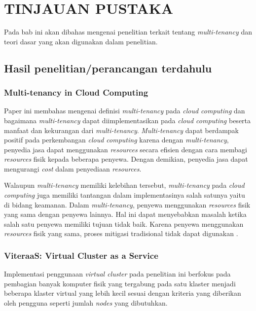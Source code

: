 \chapter{TINJAUAN PUSTAKA}

Pada bab ini akan dibahas mengenai penelitian terkait tentang \emph{multi-tenancy}
dan teori dasar yang akan digunakan dalam penelitian.

\section{Hasil penelitian/perancangan terdahulu}

\subsection{Multi-tenancy in Cloud Computing}

Paper ini membahas mengenai definisi \emph{multi-tenancy} pada \emph{cloud computing}
dan bagaimana \emph{multi-tenancy} dapat diimplementasikan pada \emph{cloud computing} beserta
manfaat dan kekurangan dari \emph{multi-tenancy}. \emph{Multi-tenancy} dapat berdampak positif
pada perkembangan \emph{cloud computing} karena dengan \emph{multi-tenancy}, penyedia jasa dapat
menggunakan \emph{resources} secara efisien dengan cara membagi \emph{resources} fisik kepada
beberapa penyewa. Dengan demikian, penyedia jasa dapat mengurangi \emph{cost} dalam penyediaan \emph{resources}.

Walaupun \emph{multi-tenancy} memiliki kelebihan tersebut,
\emph{multi-tenancy} pada \emph{cloud computing} juga memiliki tantangan dalam
implementasinya salah satunya yaitu di bidang keamanan. Dalam \emph{multi-tenancy}, penyewa
menggunakan \emph{resources} fisik yang sama dengan penyewa lainnya. Hal ini dapat
menyebabkan masalah ketika salah satu penyewa memiliki tujuan tidak baik. Karena
penyewa menggunakan \emph{resources} fisik yang sama, proses mitigasi tradisional tidak
dapat digunakan \parencite{6830928}.

\subsection{ViteraaS: Virtual Cluster as a Service}

Implementasi penggunaan \emph{virtual cluster} pada penelitian ini
berfokus pada pembagian banyak komputer fisik yang tergabung pada satu klaster
menjadi beberapa klaster virtual yang lebih kecil sesuai dengan kriteria yang diberikan oleh
pengguna seperti jumlah \emph{nodes} yang dibutuhkan.

